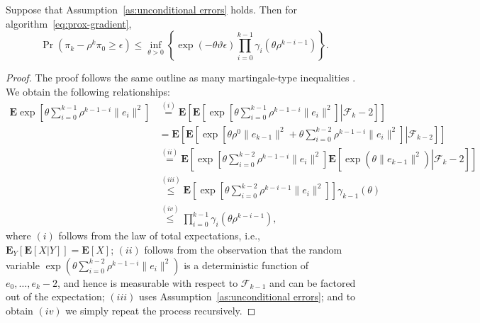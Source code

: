 \begin{thm}
  \label{th:unconditional error bound}
  Suppose that Assumption~\ref{as:unconditional errors} holds. Then
  for algorithm~\eqref{eq:prox-gradient},
  \begin{equation*}
    \Pr(\pi_k-\rho^k\pi_0\ge\epsilon)
    \le
    \inf_{\theta > 0}
    \left\{
      \exp(-\theta \vartheta\epsilon)
      \prod_{i=0}^{k-1}\gamma_i(\theta\rho^{k-i-1})
    \right\}.
  \end{equation*}
\end{thm}
\begin{proof}
  The proof follows the same outline as many martingale-type
  inequalities \cite{azuma1967weighted,chung2006concentration}. We
  obtain the following relationships:
  \begin{align*}
    \mathbf{E} \exp\left[ \theta\sum_{i=0}^{k-1}\rho^{k-1-i}\|e_i\|^2 \right]
    &\overset{(i)}{=}
    \mathbf{E}\left[
        \mathbf{E}\left[
            \exp\left.
                \left[
                 \theta\sum_{i=0}^{k-1}\rho^{k-1-i}\|e_i\|^2
                \right]
                \right|\mathcal{F}_k-2
           \right]
       \right]
\\  &=
    \mathbf{E}\left[
        \mathbf{E}\left[
            \exp\left.
                \left[
                 \theta\rho^0 \|e_{k-1}\|^2+\theta\sum_{i=0}^{k-2}\rho^{k-1-i}\|e_i\|^2
                \right]
                \right|\mathcal{F}_{k-2}
           \right]
       \right]  
\\  &\overset{(ii)}{=}
    \mathbf{E}\!\left[
            \exp\left[
                 \theta\sum_{i=0}^{k-2}\rho^{k-1-i}\|e_i\|^2
                 \right]
            \mathbf{E}\left[
                  \left.
                  \exp\left(
                        \theta\|e_{k-1}\|^2
                       \right)
                  \right| \mathcal{F}_k-2
               \right]
       \right]
\\    &\overset{(iii)}{\leq}
      \mathbf{E} \left[
        \exp \left[
          \theta \sum_{i=0}^{k-2}\rho^{k-i-1}\|e_i\|^2
          \right]
        \right]
      \gamma_{k-1}(\theta)
\\    &\overset{(iv)}{\leq}
      \prod_{i=0}^{k-1}\gamma_i(\theta \rho^{k-i-1}),
\end{align*}
where $(i)$ follows from the law of total expectations, i.e.,
$\mathbf{E}_Y[\mathbf{E}[X|Y]]=\mathbf{E}[X]$; $(ii)$ follows from the observation that the
random variable $\exp(\theta\sum_{i=0}^{k-2}\rho^{k-1-i}\|e_i\|^2)$ is
a deterministic function of $e_0,\ldots,e_k-2$, and hence is
measurable with respect to $\mathcal{F}_{k-1}$ and can be factored out of the
expectation; $(iii)$ uses Assumption~\ref{as:unconditional errors};
and to obtain $(iv)$ we simply repeat the process recursively.


\end{proof}
